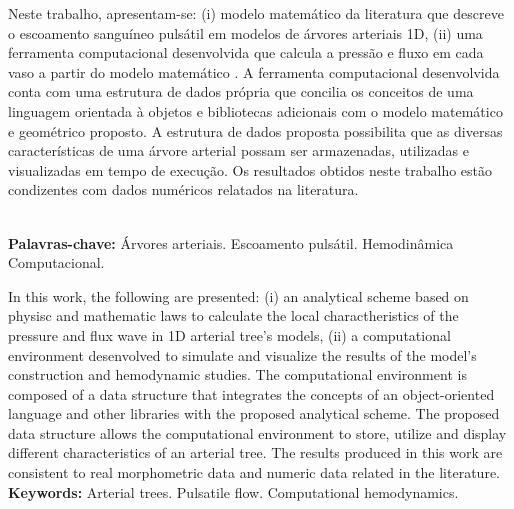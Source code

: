 \documentclass[a4paper,12pt]{monografia}
\theoremstyle{plain}
\theoremstyle{definition}
\theoremstyle{remark}
\begin{document}










Neste trabalho, apresentam-se: (i) modelo matemático da literatura que descreve o escoamento sanguíneo pulsátil em modelos de árvores arteriais 1D, (ii) uma ferramenta computacional desenvolvida que calcula a pressão e fluxo em cada vaso a partir do modelo matemático .
A ferramenta computacional desenvolvida conta com uma estrutura de dados própria que concilia os conceitos de uma linguagem orientada à objetos e bibliotecas adicionais com o modelo matemático e geométrico proposto.
A estrutura de dados proposta possibilita que as diversas características de uma árvore arterial possam ser armazenadas, utilizadas e visualizadas em tempo de execução.
Os resultados obtidos neste trabalho estão condizentes com dados numéricos relatados na literatura.

\noindent \\ \textbf{Palavras-chave:} Árvores arteriais. Escoamento pulsátil. Hemodinâmica Computacional.




In this work, the following are presented: (i) an analytical scheme based on physisc and mathematic laws to calculate the local charactheristics of the pressure and flux wave in 1D arterial tree's models, (ii) a computational environment desenvolved to simulate and visualize the results of the model's construction and hemodynamic studies. 
The computational environment is composed of a data structure that integrates the concepts of an object-oriented language and other libraries with the proposed analytical scheme.
The proposed data structure allows the computational environment to store, utilize and display different characteristics of an arterial tree. 
The results produced in this work are consistent to real morphometric data and numeric data related in the literature.
\noindent \\ \textbf{Keywords:} Arterial trees. Pulsatile flow. Computational hemodynamics. %
\end{document}
